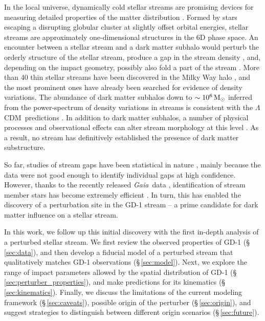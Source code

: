 \documentclass[twocolumn]{aastex62}
\newcommand{\acronym}[1]{{\small{#1}}}
\newcommand{\gaia}{\textsl{Gaia}}
\newcommand{\lcdm}{\acronym{$\Lambda$CDM}}
\begin{document}
In the local universe, dynamically cold stellar streams are promising devices for measuring detailed properties of the matter distribution \citep[e.g.,][]{johnston1999, bh2018}.
Formed by stars escaping a disrupting globular cluster at slightly offset orbital energies, stellar streams are approximately one-dimensional structures in the 6D phase space.
An encounter between a stellar stream and a dark matter subhalo would perturb the orderly structure of the stellar stream, produce a gap in the stream density \citep[e.g.,][]{johnston2002, ibata2002, carlberg2012}, and, depending on the impact geometry, possibly also fold a part of the stream \citep[e.g.,][]{yoon2011}.
More than 40 thin stellar streams have been discovered in the Milky Way halo \citep{gc2016}, and the most prominent ones have already been searched for evidence of density variations.
The abundance of dark matter subhalos down to $\sim10^6\,\rm M_\odot$ inferred from the power-spectrum of density variations in streams is consistent with the \lcdm\ predictions \citep[e.g.,][]{carlberg2012,cg2013}.
In addition to dark matter subhalos, a number of physical processes and observational effects can alter stream morphology at this level \citep[e.g.,][]{kupper2008, amorisco2016, ibata2016}.
As a result, no stream has definitively established the presence of dark matter substructure.

So far, studies of stream gaps have been statistical in nature \citep[e.g.,][]{erkal2017}, mainly because the data were not good enough to identify individual gaps at high confidence.
However, thanks to the recently released \gaia\ data \citep{gdr2}, identification of stream member stars has become extremely efficient \citep[e.g.,][]{malhan2018}.
In turn, this has enabled the discovery of a perturbation site in the GD-1 stream \citep{pwb} -- a prime candidate for dark matter influence on a stellar stream.

In this work, we follow up this initial discovery with the first in-depth analysis of a perturbed stellar stream.
We first review the observed properties of GD-1 (\S\,\ref{sec:data}), and then develop a fiducial model of a perturbed stream that qualitatively matches GD-1 observations (\S\,\ref{sec:model}).
Next, we explore the range of impact parameters allowed by the spatial distribution of GD-1 (\S\,\ref{sec:perturber_properties}), and make predictions for its kinematics (\S\,\ref{sec:kinematics}).
Finally, we discuss the limitations of the current modeling framework (\S\,\ref{sec:caveats}), possible origin of the perturber (\S\,\ref{sec:origin}), and suggest strategies to distinguish between different origin scenarios (\S\,\ref{sec:future}).
\end{document}
